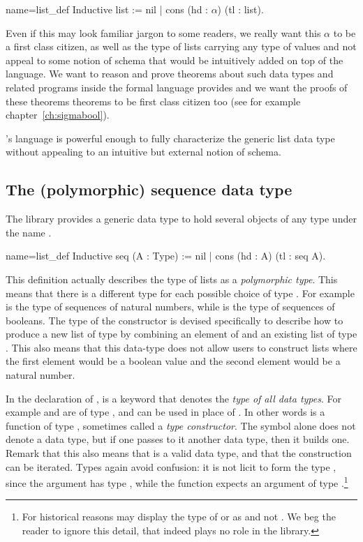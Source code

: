 \begin{coq}{name=list_def}{}
Inductive list := nil | cons (hd : $\alpha$) (tl : list).
\end{coq}

\noindent Even if this may look familiar jargon to some readers, we really want
this $\alpha$ to be a first class citizen, as well as the type of lists carrying
any type of values and not appeal to some notion of schema that would be
intuitively added on top of the \Coq{} language.  We want to 
reason and
prove theorems about such data types and related programs inside the formal
language \Coq{} provides and we want the proofs of these theorems
theorems to be first
class citizen too (see for example chapter~\ref{ch:sigmabool}).

\Coq{}'s language is powerful enough to fully characterize the generic 
list data type without appealing to an intuitive but external notion of
schema.

\subsection{The (polymorphic) sequence data type}

The \mcbMC{} library provides a generic data type to hold
several objects of any type under the name .

\begin{coq}{name=list_def}{}
Inductive seq (A : Type) := nil | cons (hd : A) (tl : seq A).
\end{coq}
This definition actually describes the type of lists as a {\em
  polymorphic type}.  This means that there is a different type
 for each possible choice of type .  For example
 is the type of sequences of natural numbers, while
 is the type of sequences of booleans.
The type of the
constructor  is devised specifically to describe how to produce a
new list of type  by combining an element of  and an
existing list of type .  This also means that this data-type
does not allow users to construct lists where the first element would be
a boolean value and the second element would be a natural number.

In the declaration of ,  is a keyword that denotes the
\emph{type of all data types}.  For example  and  are of type
, and can be used in place of .
In other words  is a function of type , sometimes
called a \emph{type constructor}.  The symbol  alone does not
denote a data type,
but if one passes to it another data type, then it builds one.  Remark
that this also means that  is a valid data type, and
that the construction can be iterated.
Types again avoid confusion: it is not licit to form the type ,
since the argument  has type , while the function
 expects an argument of type .\footnote{For historical
reasons \Coq{} may display the type of  or  as 
and not .  We beg the reader to ignore this detail, that indeed
plays no role in the \mcbMC{} library.}

